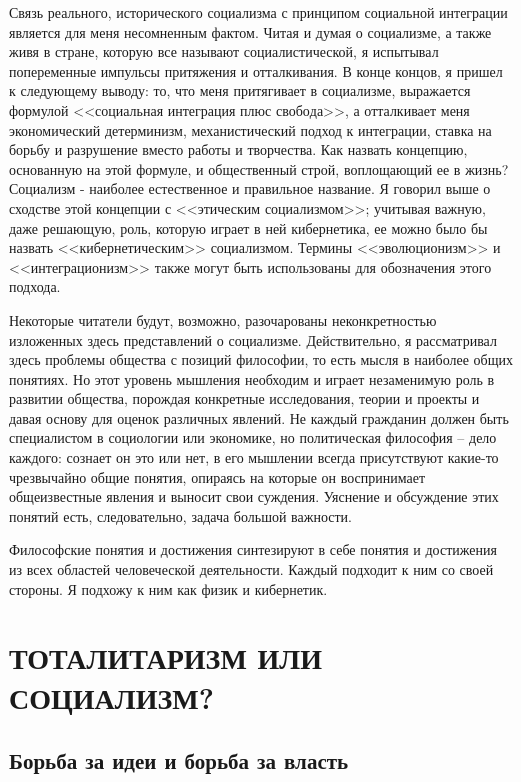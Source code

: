 \documentclass{book}
\begin{document}
Связь реального, исторического социализма с принципом социальной интеграции является для меня несомненным фактом. Читая и думая о социализме, а также живя в стране, которую все называют социалистической, я испытывал попеременные импульсы притяжения и отталкивания. В конце концов, я при­шел к следующему выводу: то, что меня притягивает в социализ­ме, выражается формулой <<социальная интеграция плюс свобо­да>>, а отталкивает меня экономический детерминизм, механи­стический подход к интеграции, ставка на борьбу и разрушение вместо работы и творчества. Как назвать концепцию, основан­ную на этой формуле, и общественный строй, воплощающий ее в жизнь? Социализм - наиболее естественное и правильное на­звание. Я говорил выше о сходстве этой концепции с <<этическим социализмом>>; учитывая важную, даже решающую, роль, которую играет в ней кибернетика, ее можно было бы назвать <<кибер­нетическим>> социализмом. Термины <<эволюционизм>> и <<интеграционизм>> также могут быть использованы для обозначения этого подхода.

Некоторые читатели будут, возможно, разочарованы неконк­ретностью изложенных здесь представлений о социализме. Дейст­вительно, я рассматривал здесь проблемы общества с позиций философии, то есть мысля в наиболее общих понятиях. Но этот уровень мышления необходим и играет незаменимую роль в раз­витии общества, порождая конкретные исследования, теории и проекты и давая основу для оценок различных явлений. Не каж­дый гражданин должен быть специалистом в социологии или экономике, но политическая философия -- дело каждого: со­знает он это или нет, в его мышлении всегда присутствуют какие-то чрезвычайно общие понятия, опираясь на которые он воспри­нимает общеизвестные явления и выносит свои суждения. Уяс­нение и обсуждение этих понятий есть, следовательно, задача большой важности.

Философские понятия и достижения синтезируют в себе поня­тия и достижения из всех областей человеческой деятельности. Каждый подходит к ним со своей стороны. Я подхожу к ним как физик и кибернетик.



\chapter{ТОТАЛИТАРИЗМ ИЛИ СОЦИАЛИЗМ?}

\section{Борьба за идеи и борьба за власть}
\end{document}
